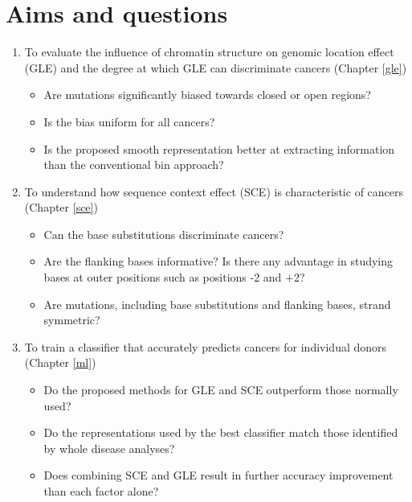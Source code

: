 \section{Aims and questions}
\label{intro:aims}
\begin{enumerate}
    \item To evaluate the influence of chromatin structure on genomic location effect (GLE) and the degree at which GLE can discriminate cancers (Chapter \ref{gle})
    \begin{itemize}
        \item Are mutations significantly biased towards closed or open regions?
        \item Is the bias uniform for all cancers?
        \item Is the proposed smooth representation better at extracting information than the conventional bin approach?
    \end{itemize}
    \item To understand how sequence context effect (SCE) is characteristic of cancers (Chapter \ref{sce})
    \begin{itemize}
        \item Can the base substitutions discriminate cancers?
        \item Are the flanking bases informative? Is there any advantage in studying bases at outer positions such as positions -2 and +2?
        \item Are mutations, including base substitutions and flanking bases, strand symmetric?
    \end{itemize}
    \item To train a classifier that accurately predicts cancers for individual donors (Chapter \ref{ml})
    \begin{itemize}
        \item Do the proposed methods for GLE and SCE outperform those normally used?
        \item Do the representations used by the best classifier match those identified by whole disease analyses?
        \item Does combining SCE and GLE result in further accuracy improvement than each factor alone?
    \end{itemize}
\end{enumerate}


